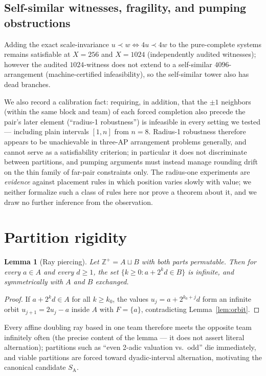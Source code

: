 \documentclass[11pt]{article}
\newtheorem{lemma}[theorem]{Lemma}
\theoremstyle{definition}
\newcommand{\Z}{\mathbb{Z}}
\newcommand{\SA}{S_{\mathrm{A}}}
\begin{document}
\subsection{Self-similar witnesses, fragility, and pumping obstructions}

Adding the exact scale-invariance $u \prec w \iff 4u \prec 4w$ to the
pure-complete systems remains satisfiable at $X = 256$ and $X = 1024$
(independently audited witnesses); however the audited $1024$-witness does not
extend to a self-similar $4096$-arrangement (machine-certified infeasibility),
so the self-similar tower also has dead branches.

We also record a calibration fact: requiring, in addition, that the $\pm 1$
neighbors (within the same block and team) of each forced completion also
precede the pair's later element (``radius-1 robustness'') is infeasible in
every setting we tested --- including plain intervals $[1, n]$ from $n = 8$.
Radius-1 robustness therefore appears to be unachievable in three-AP
arrangement problems generally, and cannot serve as a satisfiability
criterion; in particular it does
not discriminate between partitions, and pumping arguments must instead manage
rounding drift on the thin family of far-pair constraints only. The
radius-one experiments are \emph{evidence} against placement rules in which
position varies slowly with value; we neither formalize such a class of
rules here nor prove a theorem about it, and we draw no further inference
from the observation.

\section{Partition rigidity}

\begin{lemma}[Ray piercing]\label{lem:ray}
Let $\Z^+ = A \sqcup B$ with both parts permutable. Then for every $a \in A$ and
every $d \ge 1$, the set $\{k \ge 0 : a + 2^k d \in B\}$ is infinite, and
symmetrically with $A$ and $B$ exchanged.
\end{lemma}

\begin{proof}
If $a + 2^k d \in A$ for all $k \ge k_0$, the values $u_j = a + 2^{k_0+j} d$
form an infinite orbit $u_{j+1} = 2u_j - a$ inside $A$ with $F = \{a\}$,
contradicting Lemma~\ref{lem:orbit}.
\end{proof}

Every affine doubling ray based in one team therefore meets the opposite
team infinitely often (the precise content of the lemma --- it does not
assert literal alternation); partitions
such as ``even 2-adic valuation vs.\ odd'' die immediately, and viable partitions
are forced toward dyadic-interval alternation, motivating the canonical
candidate $\SA$.
\end{document}
